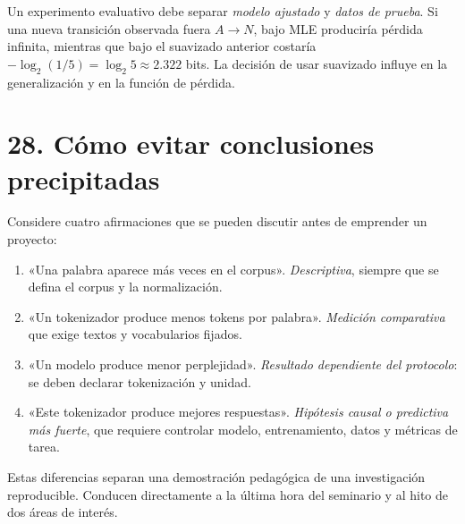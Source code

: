 Un experimento evaluativo debe separar \emph{modelo ajustado} y \emph{datos de prueba}. Si una nueva transición observada fuera $A\to N$, bajo MLE produciría pérdida infinita, mientras que bajo el suavizado anterior costaría $-\log_2(1/5)=\log_2 5\approx2.322$ bits. La decisión de usar suavizado influye en la generalización y en la función de pérdida.

\section*{28. Cómo evitar conclusiones precipitadas}
Considere cuatro afirmaciones que se pueden discutir antes de emprender un proyecto:
\begin{enumerate}
\item «Una palabra aparece más veces en el corpus». \emph{Descriptiva}, siempre que se defina el corpus y la normalización.
\item «Un tokenizador produce menos tokens por palabra». \emph{Medición comparativa} que exige textos y vocabularios fijados.
\item «Un modelo produce menor perplejidad». \emph{Resultado dependiente del protocolo}: se deben declarar tokenización y unidad.
\item «Este tokenizador produce mejores respuestas». \emph{Hipótesis causal o predictiva más fuerte}, que requiere controlar modelo, entrenamiento, datos y métricas de tarea.
\end{enumerate}
Estas diferencias separan una demostración pedagógica de una investigación reproducible. Conducen directamente a la última hora del seminario y al hito de dos áreas de interés.
\clearpage
